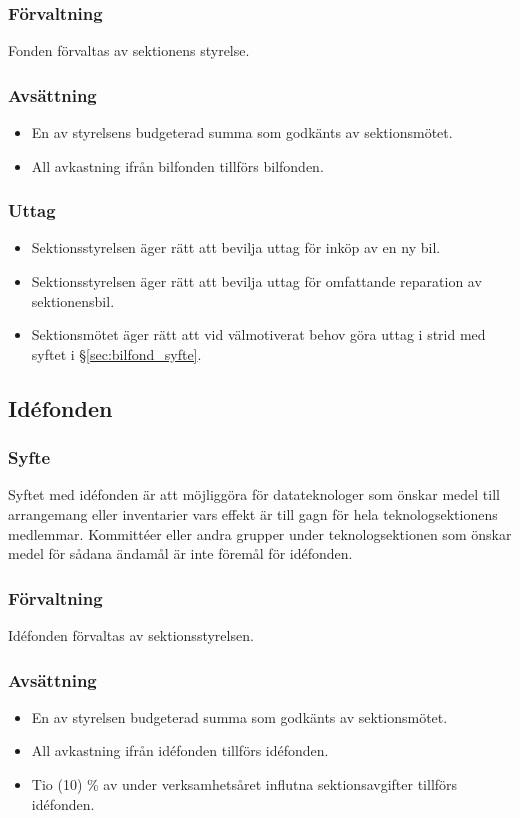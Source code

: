 \documentclass[a4paper, 10pt]{article}
\begin{document}
\subsubsection{Förvaltning}
Fonden förvaltas av sektionens styrelse.
\subsubsection{Avsättning}
\begin{itemize}
\item En av styrelsens budgeterad summa som godkänts av sektionsmötet.
\item All avkastning ifrån bilfonden tillförs bilfonden.
\end{itemize}
\subsubsection{Uttag}
\begin{itemize}
\item Sektionsstyrelsen äger rätt att bevilja uttag för inköp av en ny bil.
\item Sektionsstyrelsen äger rätt att bevilja uttag för omfattande reparation av sektionensbil.
\item Sektionsmötet äger rätt att vid välmotiverat behov göra uttag i strid med syftet i \S\ref{sec:bilfond_syfte}.
\end{itemize}

\subsection{Idéfonden}
\subsubsection{Syfte}
\label{sec:idefond_syfte}
Syftet med idéfonden är att möjliggöra för datateknologer som önskar medel till arrangemang eller inventarier vars effekt är till gagn för hela teknologsektionens medlemmar. Kommittéer eller andra grupper under teknologsektionen som önskar medel för sådana ändamål är inte föremål för idéfonden.
\subsubsection{Förvaltning}
Idéfonden förvaltas av sektionsstyrelsen.
\subsubsection{Avsättning}
\begin{itemize}
\item En av styrelsen budgeterad summa som godkänts av sektionsmötet.
\item All avkastning ifrån idéfonden tillförs idéfonden.
\item Tio (10) \% av under verksamhetsåret influtna sektionsavgifter tillförs idéfonden.
\end{itemize}
\end{document}
